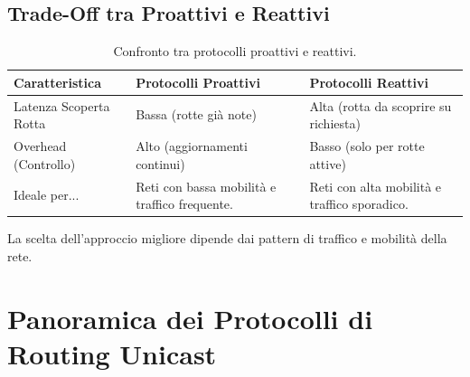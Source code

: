 \documentclass{article}
\begin{document}
\subsection{Trade-Off tra Proattivi e Reattivi}
\begin{table}[H]
    \centering
    \begin{tabular}{|l|p{5cm}|p{5cm}|}
        \hline
        \textbf{Caratteristica} & \textbf{Protocolli Proattivi} & \textbf{Protocolli Reattivi} \\
        \hline
        Latenza Scoperta Rotta & Bassa (rotte già note) & Alta (rotta da scoprire su richiesta) \\
        \hline
        Overhead (Controllo) & Alto (aggiornamenti continui) & Basso (solo per rotte attive) \\
        \hline
        Ideale per... & Reti con bassa mobilità e traffico frequente. & Reti con alta mobilità e traffico sporadico. \\
        \hline
    \end{tabular}
    \caption{Confronto tra protocolli proattivi e reattivi.}
    \label{tab:pro_vs_rea}
\end{table}
La scelta dell'approccio migliore dipende dai pattern di traffico e mobilità della rete.

\section{Panoramica dei Protocolli di Routing Unicast}
\end{document}
